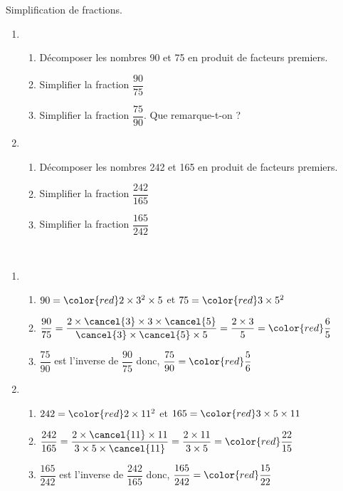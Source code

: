 \begin{exercice*}
   Simplification de fractions.
   \begin{enumerate}
      \item
         \begin{enumerate}
            \item Décomposer les nombres 90 et 75 en produit de facteurs premiers.
            \item Simplifier la fraction $\dfrac{90}{75}$ \medskip
            \item Simplifier la fraction $\dfrac{75}{90}$. Que remarque-t-on ? \smallskip
         \end{enumerate}
      \item
         \begin{enumerate}
            \item Décomposer les nombres 242 et 165 en produit de facteurs premiers.
            \item Simplifier la fraction $\dfrac{242}{165}$ \medskip
            \item Simplifier la fraction $\dfrac{165}{242}$
         \end{enumerate}
   \end{enumerate}
\end{exercice*}
\begin{corrige}
\ \\ [-5mm]
   \begin{enumerate}
      \item
         \begin{enumerate}
            \item $90 ={\color{red} 2\times3^2\times5}$ et $75 ={\color{red} 3\times5^2}$ \smallskip
            \item $\dfrac{90}{75} =\dfrac{2\times\cancel{3}\times3\times\cancel{5}}{\cancel{3}\times\cancel{5}\times5} =\dfrac{2\times3}{5} ={\color{red} \dfrac65}$ \smallskip
            \item $\dfrac{75}{90}$ est l'inverse de $\dfrac{90}{75}$ donc, $\dfrac{75}{90}={\color{red} \dfrac56}$ \smallskip
         \end{enumerate}
      \setcounter{enumi}{1}
      \item          
         \begin{enumerate}
            \item $242 =\color{red} 2\times11^2$ et $165 =\color{red}3\times5\times11$ \smallskip
            \item $\dfrac{242}{165} =\dfrac{2\times\cancel{11}\times11}{3\times5\times\cancel{11}} =\dfrac{2\times11}{3\times5} ={\color{red} \dfrac{22}{15}}$ \smallskip
            \item $\dfrac{165}{242}$ est l'inverse de $\dfrac{242}{165}$ donc, $\dfrac{165}{242} ={\color{red} \dfrac{15}{22}}$
         \end{enumerate}
   \end{enumerate}
\end{corrige}
